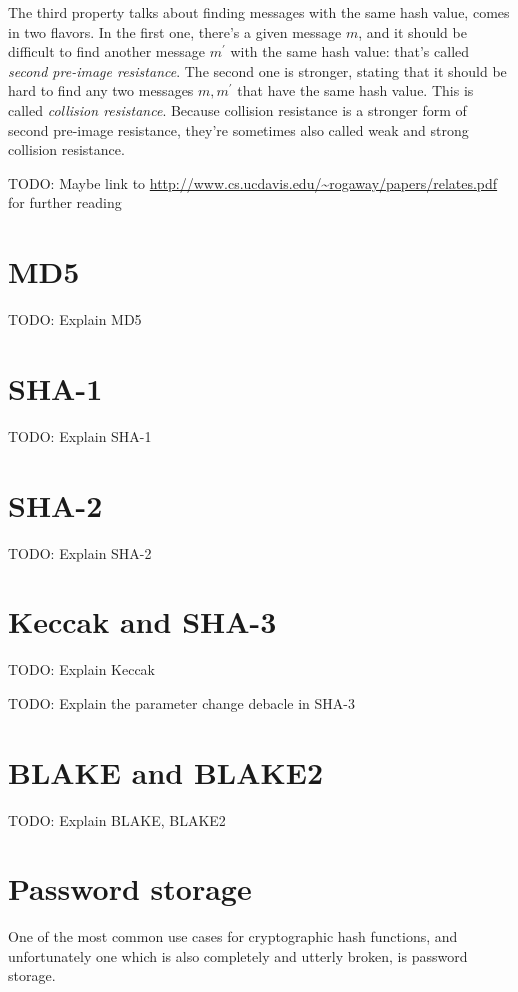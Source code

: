 \documentclass[11pt,ebook,table,dvipsnames]{memoir}
\begin{document}
The third property talks about finding messages with the same hash
value, comes in two flavors. In the first one, there's a given message
$m$, and it should be difficult to find another message $m^{\prime}$
with the same hash value: that's called \emph{second pre-image resistance}.
The second one is stronger, stating that it should be hard to find any
two messages $m, m^{\prime}$ that have the same hash value. This is
called \emph{collision resistance}. Because collision resistance is a
stronger form of second pre-image resistance, they're sometimes also
called weak and strong collision resistance.

TODO: Maybe link to
\url{http://www.cs.ucdavis.edu/~rogaway/papers/relates.pdf} for further reading
\section{MD5}
\label{sec-2-6-2}

TODO: Explain MD5
\section{SHA-1}
\label{sec-2-6-3}

TODO: Explain SHA-1
\section{SHA-2}
\label{sec-2-6-4}

TODO: Explain SHA-2
\section{Keccak and SHA-3}
\label{sec-2-6-5}

TODO: Explain Keccak

TODO: Explain the parameter change debacle in SHA-3
\section{BLAKE and BLAKE2}
\label{sec-2-6-6}

TODO: Explain BLAKE, BLAKE2
\section{Password storage\label{password-storage}}
\label{sec-2-6-7}

One of the most common use cases for cryptographic hash functions,
and unfortunately one which is also completely and utterly broken, is
password storage.
\end{document}
